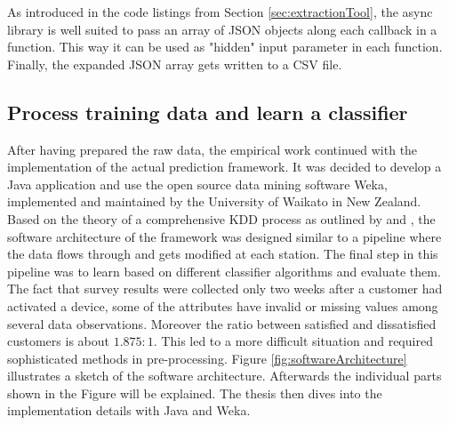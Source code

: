 As introduced in the code listings from Section \ref{sec:extractionTool}, the async library is well suited to pass an array of JSON objects along each callback in a function. This way it can be used as "hidden" input parameter in each function. Finally, the expanded JSON array gets written to a CSV file. 

\subsection{Process training data and learn a classifier}
After having prepared the raw data, the empirical work continued with the implementation of the actual prediction framework. It was decided to develop a Java application and use the open source data mining software Weka, implemented and maintained by the University of Waikato in New Zealand. Based on the theory of a comprehensive KDD process as outlined by \cite{fayyad1996data} and \cite{neckel2015}, the software architecture of the framework was designed similar to a pipeline where the data flows through and gets modified at each station. The final step in this pipeline was to learn based on different classifier algorithms and evaluate them. The fact that survey results were collected only two weeks after a customer had activated a device, some of the attributes have invalid or missing values among several data observations. Moreover the ratio between satisfied and dissatisfied customers is about $1.875:1$. This led to a more difficult situation and required sophisticated methods in pre-processing. Figure \ref{fig:softwareArchitecture} illustrates a sketch of the software architecture. Afterwards the individual parts shown in the Figure will be explained. The thesis then dives into the implementation details with Java and Weka.

